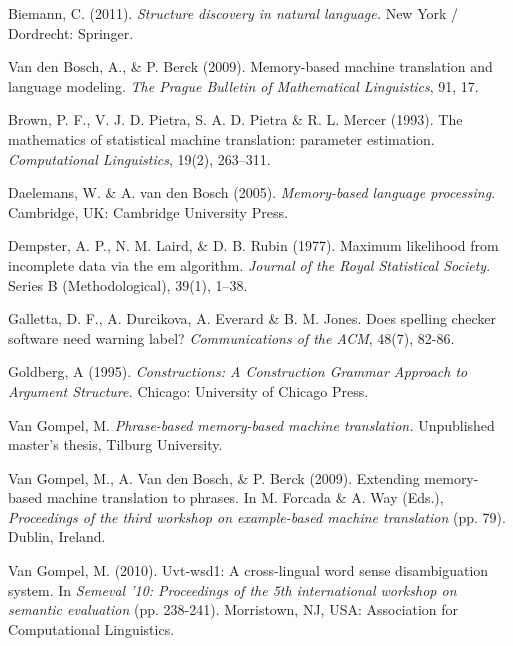 \documentclass[12pt]{article}
\begin{document}
\begin{thebibliography}{99}

Biemann, C. (2011). \emph{Structure discovery in natural language.} New York / Dordrecht: Springer.

Van den Bosch, A., \& P. Berck (2009). Memory-based machine translation and language modeling. \emph{The Prague Bulletin of Mathematical Linguistics}, 91, 17.

Brown, P. F., V. J. D. Pietra, S. A. D. Pietra \& R. L. Mercer (1993). The mathematics of statistical machine translation: parameter estimation. \emph{Computational Linguistics}, 19(2), 263–311.

Daelemans, W. \& A. van den Bosch (2005). \emph{Memory-based language processing}. Cambridge, UK: Cambridge University Press.

Dempster, A. P., N. M. Laird, \& D. B. Rubin (1977). Maximum likelihood from incomplete data via the em algorithm. \emph{Journal of the Royal Statistical Society}. Series B (Methodological), 39(1), 1–38.

Galletta, D. F., A. Durcikova, A. Everard \& B. M. Jones. Does spelling checker software need warning label? \emph{Communications of the ACM}, 48(7), 82-86.

Goldberg, A (1995). \emph{Constructions: A Construction Grammar Approach to Argument Structure.} Chicago: University of Chicago Press.

Van Gompel, M. \emph{Phrase-based memory-based machine translation.} Unpublished
master's thesis, Tilburg University.

Van Gompel, M., A. Van den Bosch, \& P. Berck (2009). Extending memory-based machine translation to phrases. In M. Forcada \& A. Way (Eds.), \emph{Proceedings of the third workshop on example-based machine translation} (pp. 79). Dublin, Ireland.

Van Gompel, M. (2010). Uvt-wsd1: A cross-lingual word sense disambiguation system. In \emph{Semeval '10: Proceedings of the 5th international workshop on semantic evaluation} (pp. 238-241). Morristown, NJ, USA: Association for Computational Linguistics.


\end{thebibliography}
\end{document}
